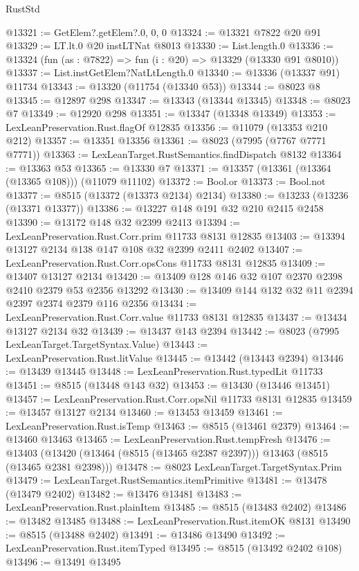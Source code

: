 \begin{lexlean}{RustStd}
\begin{coremodule}
@13321 := GetElem?.getElem?.{0, 0, 0}
@13324 := @13321 @7822 @20 @91
@13329 := LT.lt.{0} @20 instLTNat @8013
@13330 := List.length.{0}
@13336 := @13324 (fun (as : @7822) => fun (i : @20) => @13329 (@13330 @91 @8010))
@13337 := List.instGetElem?NatLtLength.{0}
@13340 := @13336 (@13337 @91) @11734
@13343 := @13320 (@11754 (@13340 @53))
@13344 := @8023 @8
@13345 := @12897 @298
@13347 := @13343 (@13344 @13345)
@13348 := @8023 @7
@13349 := @12920 @298
@13351 := @13347 (@13348 @13349)
@13353 := LexLeanPreservation.Rust.flagOf @12835
@13356 := @11079 (@13353 @210 @212)
@13357 := @13351 @13356
@13361 := @8023 (@7995 (@7767 @7771 @7771))
@13363 := LexLeanTarget.RustSemantics.findDispatch @8132
@13364 := @13363 @53
@13365 := @13330 @7
@13371 := @13357 (@13361 (@13364 (@13365 @108))) (@11079 @11102)
@13372 := Bool.or
@13373 := Bool.not
@13377 := @8515 (@13372 (@13373 @2134) @2134)
@13380 := @13233 (@13236 (@13371 @13377))
@13386 := @13227 @148 @191 @32 @210 @2415 @2458
@13390 := @13172 @148 @32 @2399 @2413
@13394 := LexLeanPreservation.Rust.Corr.prim @11733 @8131 @12835
@13403 := @13394 @13127 @2134 @138 @147 @108 @32 @2399 @2411 @2402
@13407 := LexLeanPreservation.Rust.Corr.opsCons @11733 @8131 @12835
@13409 := @13407 @13127 @2134
@13420 := @13409 @128 @146 @32 @107 @2370 @2398 @2410 @2379 @53 @2356 @13292
@13430 := @13409 @144 @132 @32 @11 @2394 @2397 @2374 @2379 @116 @2356
@13434 := LexLeanPreservation.Rust.Corr.value @11733 @8131 @12835
@13437 := @13434 @13127 @2134 @32
@13439 := @13437 @143 @2394
@13442 := @8023 (@7995 LexLeanTarget.TargetSyntax.Value)
@13443 := LexLeanPreservation.Rust.litValue
@13445 := @13442 (@13443 @2394)
@13446 := @13439 @13445
@13448 := LexLeanPreservation.Rust.typedLit @11733
@13451 := @8515 (@13448 @143 @32)
@13453 := @13430 (@13446 @13451)
@13457 := LexLeanPreservation.Rust.Corr.opsNil @11733 @8131 @12835
@13459 := @13457 @13127 @2134
@13460 := @13453 @13459
@13461 := LexLeanPreservation.Rust.isTemp
@13463 := @8515 (@13461 @2379)
@13464 := @13460 @13463
@13465 := LexLeanPreservation.Rust.tempFresh
@13476 := @13403 (@13420 (@13464 (@8515 (@13465 @2387 @2397))) @13463 (@8515 (@13465 @2381 @2398)))
@13478 := @8023 LexLeanTarget.TargetSyntax.Prim
@13479 := LexLeanTarget.RustSemantics.itemPrimitive
@13481 := @13478 (@13479 @2402)
@13482 := @13476 @13481
@13483 := LexLeanPreservation.Rust.plainItem
@13485 := @8515 (@13483 @2402)
@13486 := @13482 @13485
@13488 := LexLeanPreservation.Rust.itemOK @8131
@13490 := @8515 (@13488 @2402)
@13491 := @13486 @13490
@13492 := LexLeanPreservation.Rust.itemTyped
@13495 := @8515 (@13492 @2402 @108)
@13496 := @13491 @13495

\end{coremodule}
\end{lexlean}
